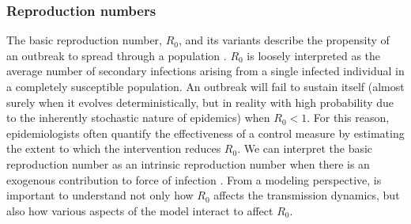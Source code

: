 
\subsubsection{Reproduction numbers}
\label{subsubsec:stratmod_repnumbs}
The basic reproduction number, $ R_0 $, and its variants describe the propensity of an outbreak to spread through a population \cite{heffernan2005perspectives,van2008further}. $ R_0 $ is loosely interpreted as the average number of secondary infections arising from a single infected individual in a completely susceptible population. An outbreak will fail to sustain itself (almost surely when it evolves deterministically, but in reality with high probability due to the inherently stochastic nature of epidemics) when $ R_0 < 1 $. For this reason, epidemiologists often quantify the effectiveness of a control measure by estimating the extent to which the intervention reduces $ R_0 $. We can interpret the basic reproduction number as an intrinsic reproduction number when there is an exogenous contribution to force of infection \cite{blackwood2018introduction}. From a modeling perspective, is important to understand not only how $ R_0 $ affects the transmission dynamics, but also how various aspects of the model interact to affect $ R_0 $. 

